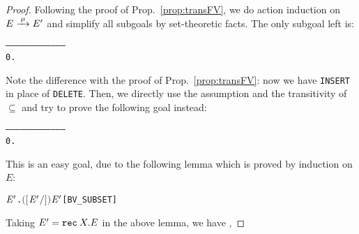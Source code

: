 \begin{proof}
Following the proof of Prop.~\ref{prop:transFV}, we do action
induction on $E \arr{\mu} E'$ and simplify all subgoals by set-theoretic
facts. The only subgoal left is:
\begin{alltt}
   ------------------------------------
    0.  
\end{alltt}
Note the difference with the proof of Prop.~\ref{prop:transFV}: now
we have \texttt{INSERT} in place of \texttt{DELETE}. Then, we directly
use the assumption and the transitivity of $\subseteq$ and try to
prove the following goal instead:
\begin{alltt}
   ------------------------------------
    0.  
\end{alltt}
This is an easy goal, due to the following lemma which is
 proved by induction on $E$:
\begin{alltt}
\HOLTokenTurnstile{} \HOLSymConst{\HOLTokenForall{}}  \ensuremath{\HOLBoundVar{E}\sp{\prime}}.  \ensuremath{(}\ensuremath{[}\ensuremath{\HOLBoundVar{E}\sp{\prime}}\ensuremath{/}\ensuremath{]} \ensuremath{)} \HOLSymConst{\HOLTokenSubset{}}   \HOLSymConst{\HOLTokenUnion{}}  \ensuremath{\HOLBoundVar{E}\sp{\prime}}\hfill{[BV_SUBSET]}
\end{alltt}
Taking $E ' = {\tt rec}\: X . E$ in the above lemma, we have
    ,

\end{proof}
